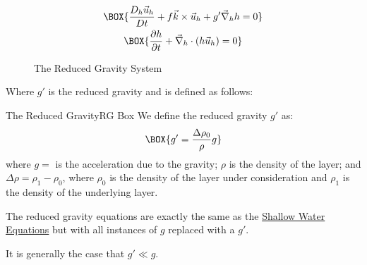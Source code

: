 \begin{minipage}{0.48\linewidth}
    \begin{gather}
        \label{RG mom}
        \BOX{\frac{D_h\vec{u}_h}{Dt}+f\vec{k}\times\vec{u}_h+g'\vec{\nabla}_h h=0}\\
        \label{RG mass}
        \BOX{\frac{\partial h}{\partial t}+\vec{\nabla}_h\cdot(h\vec{u}_h)=0}
    \end{gather}
\end{minipage}
\hfill
\begin{minipage}{0.48\linewidth}
    \begin{figure}[H]
        \centering
        \caption{The Reduced Gravity System}
        \label{RG Fig}
    \end{figure}
\end{minipage}

Where \(g'\) is the reduced gravity and is defined as follows:

\begin{fact}{The Reduced Gravity}{RG Box}\label{RG Box}
    We define the reduced gravity \(g'\) as:
    \begin{align}
        \BOX{g'=\frac{\Delta \rho_0}{\rho}g}
    \end{align}
    where \(g=\) is the acceleration due to the gravity; \(\rho\) is the density of the layer; and \(\Delta \rho = \rho_1-\rho_0\), where \(\rho_0\) is the density of the layer under consideration and \(\rho_1\) is the density of the underlying layer.

    The reduced gravity equations are exactly the same as the \hyperref[shallow box]{Shallow Water Equations} but with all instances of \(g\) replaced with a \(g'\).

    It is generally the case that \(g'\ll g\). 
\end{fact}

